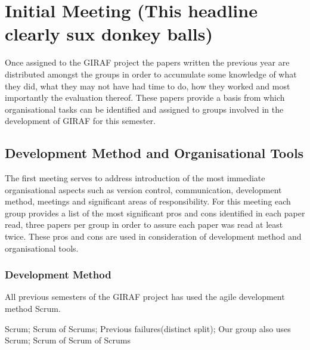\section{Initial Meeting (This headline clearly sux donkey balls)}
Once assigned to the GIRAF project the papers written the previous year are distributed amongst the groups in order to accumulate some knowledge of what they did, what they may not have had time to do,  how they worked and most importantly the evaluation thereof.
These papers provide a basis from which organisational tasks can be identified and assigned to groups involved in the development of GIRAF for this semester.

\subsection{Development Method and Organisational Tools}
The first meeting serves to address introduction of the most immediate organisational aspects such as version control, communication, development method, meetings and significant areas of responsibility.
For this meeting each group provides a list of the most significant pros and cons identified in each paper read, three papers per group in order to assure each paper was read at least twice.
These pros and cons are used in consideration of development method and organisational tools.

\subsubsection*{Development Method}
All previous semesters of the GIRAF project has used the agile development method Scrum.

Scrum; Scrum of Scrums; Previous failures(distinct split); Our group also uses Scrum; Scrum of Scrum of Scrums

